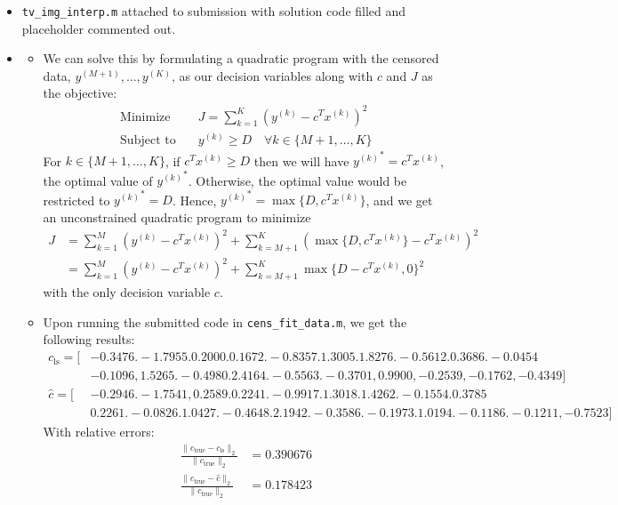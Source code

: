 \documentclass{article}
\newcommand{\1}{\mathbf{1}}
\begin{document}
\begin{itemize}
  \item \texttt{tv\_img\_interp.m} attached to submission with solution code filled and placeholder commented out.

  \item
  \begin{itemize}
    \item[1.] We can solve this by formulating a quadratic program with the censored data, $y^{(M+1)}, \dots, y^{(K)}$, as our decision variables along with $c$ and $J$ as the objective:
    \begin{align*}
      \text{Minimize} \quad &J = \sum_{k=1}^K \left(y^{(k)} - c^T x^{(k)}\right)^2 \\
      \text{Subject to} \quad &y^{(k)} \ge D \quad \forall k \in \{M + 1, \dots, K\}
    \end{align*}
    For $k \in \{M + 1, \dots, K\}$, if $c^T x^{(k)} \ge D$ then we will have ${y^{(k)}}^* = c^T x^{(k)}$, the optimal value of ${y^{(k)}}^*$. Otherwise, the optimal value would be restricted to ${y^{(k)}}^* = D$. Hence, ${y^{(k)}}^* = \max\{D, c^T x^{(k)}\}$, and we get an unconstrained quadratic program to minimize
    \begin{align*}
      J &= \sum_{k=1}^M \left(y^{(k)} - c^T x^{(k)}\right)^2 + \sum_{k=M+1}^K \left(\max\{D, c^T x^{(k)}\} - c^T x^{(k)}\right)^2 \\
      &= \sum_{k=1}^M \left(y^{(k)} - c^T x^{(k)}\right)^2 + \sum_{k=M+1}^K \max\{D - c^T x^{(k)}, 0\}^2
    \end{align*}
    with the only decision variable $c$.

    \item[2.] Upon running the submitted code in \texttt{cens\_fit\_data.m}, we get the following results:
    \begin{align*}
      c_\text{ls} = [&-0.3476. -1.7955. 0.2000. 0.1672. -0.8357. 1.3005. 1.8276. -0.5612. 0.3686. -0.0454 \\
   &-0.1096, 1.5265. -0.4980. 2.4164. -0.5563. -0.3701, 0.9900, -0.2539, -0.1762, -0.4349] \\
   \hat{c} = [&-0.2946. -1.7541, 0.2589. 0.2241. -0.9917. 1.3018. 1.4262. -0.1554. 0.3785 \\
    &0.2261. -0.0826. 1.0427. -0.4648. 2.1942. -0.3586. -0.1973. 1.0194. -0.1186. -0.1211, -0.7523]
    \end{align*}
    With relative errors:
    \begin{align*}
      \frac{\|c_\text{true} - c_\text{ls}\|_2}{\|c_\text{true}\|_2} &= 0.390676 \\
      \frac{\|c_\text{true} - \hat{c}\|_2}{\|c_\text{true}\|_2} &= 0.178423
    \end{align*}
  \end{itemize}
\end{itemize}
\end{document}
